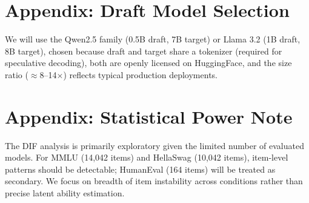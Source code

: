 \documentclass{article}
\begin{document}




\appendix

\section{Appendix: Draft Model Selection}

We will use the Qwen2.5 family (0.5B draft, 7B target) or Llama 3.2 (1B draft, 8B target), chosen because draft and target share a tokenizer (required for speculative decoding), both are openly licensed on HuggingFace, and the size ratio ($\approx$8--14$\times$) reflects typical production deployments.

\section{Appendix: Statistical Power Note}

The DIF analysis is primarily exploratory given the limited number of evaluated models. For MMLU (14,042 items) and HellaSwag (10,042 items), item-level patterns should be detectable; HumanEval (164 items) will be treated as secondary. We focus on breadth of item instability across conditions rather than precise latent ability estimation.
\end{document}
